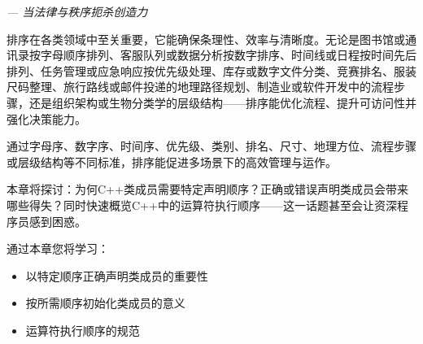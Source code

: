 
\begin{flushright}
\textit{--- 当法律与秩序扼杀创造力}
\end{flushright}

排序在各类领域中至关重要，它能确保条理性、效率与清晰度。无论是图书馆或通讯录按字母顺序排列、客服队列或数据分析按数字排序、时间线或日程按时间先后排列、任务管理或应急响应按优先级处理、库存或数字文件分类、竞赛排名、服装尺码整理、旅行路线或邮件投递的地理路径规划、制造业或软件开发中的流程步骤，还是组织架构或生物分类学的层级结构——排序能优化流程、提升可访问性并强化决策能力。

通过字母序、数字序、时间序、优先级、类别、排名、尺寸、地理方位、流程步骤或层级结构等不同标准，排序能促进多场景下的高效管理与运作。

本章将探讨：为何C++类成员需要特定声明顺序？正确或错误声明类成员会带来哪些得失？同时快速概览C++中的运算符执行顺序——这一话题甚至会让资深程序员感到困惑。

通过本章您将学习：

\begin{itemize}
\item 
以特定顺序正确声明类成员的重要性

\item 
按所需顺序初始化类成员的意义

\item 
运算符执行顺序的规范
\end{itemize}













